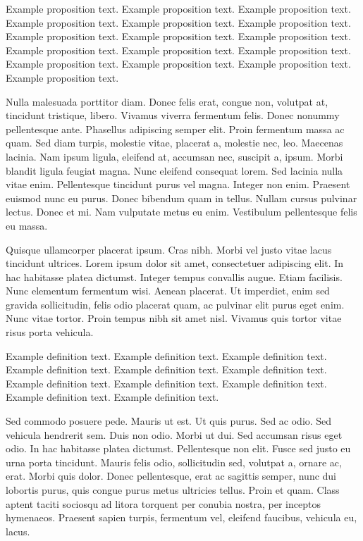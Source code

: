 \documentclass[CJCE,STIX2COL]{WileyNJD-v2}
\begin{document}
\begin{proposition}
Example proposition text. Example proposition text. Example proposition text. Example proposition text. Example proposition text. Example proposition text. Example proposition text. Example proposition text. Example proposition text. Example proposition text. Example proposition text. Example proposition text. Example proposition text. Example proposition text. Example proposition text. Example proposition text. 
\end{proposition}

Nulla malesuada porttitor diam. Donec felis erat, congue non, volutpat at, tincidunt tristique, libero. Vivamus
viverra fermentum felis. Donec nonummy pellentesque ante. Phasellus adipiscing semper elit. Proin fermentum massa
ac quam. Sed diam turpis, molestie vitae, placerat a, molestie nec, leo. Maecenas lacinia. Nam ipsum ligula, eleifend
at, accumsan nec, suscipit a, ipsum. Morbi blandit ligula feugiat magna. Nunc eleifend consequat lorem. Sed lacinia
nulla vitae enim. Pellentesque tincidunt purus vel magna. Integer non enim. Praesent euismod nunc eu purus. Donec
bibendum quam in tellus. Nullam cursus pulvinar lectus. Donec et mi. Nam vulputate metus eu enim. Vestibulum
pellentesque felis eu massa.

Quisque ullamcorper placerat ipsum. Cras nibh. Morbi vel justo vitae lacus tincidunt ultrices. Lorem ipsum dolor sit
amet, consectetuer adipiscing elit. In hac habitasse platea dictumst. Integer tempus convallis augue. Etiam facilisis.
Nunc elementum fermentum wisi. Aenean placerat. Ut imperdiet, enim sed gravida sollicitudin, felis odio placerat
quam, ac pulvinar elit purus eget enim. Nunc vitae tortor. Proin tempus nibh sit amet nisl. Vivamus quis tortor
vitae risus porta vehicula.

\begin{definition}
Example definition text. Example definition text. Example definition text. Example definition text. Example definition text. Example definition text. Example definition text. Example definition text. Example definition text. Example definition text. Example definition text.
\end{definition}

Sed commodo posuere pede. Mauris ut est. Ut quis purus. Sed ac odio. Sed vehicula hendrerit sem. Duis non
odio. Morbi ut dui. Sed accumsan risus eget odio. In hac habitasse platea dictumst. Pellentesque non elit. Fusce
sed justo eu urna porta tincidunt. Mauris felis odio, sollicitudin sed, volutpat a, ornare ac, erat. Morbi quis dolor.
Donec pellentesque, erat ac sagittis semper, nunc dui lobortis purus, quis congue purus metus ultricies tellus. Proin
et quam. Class aptent taciti sociosqu ad litora torquent per conubia nostra, per inceptos hymenaeos. Praesent sapien
turpis, fermentum vel, eleifend faucibus, vehicula eu, lacus.
\end{document}
